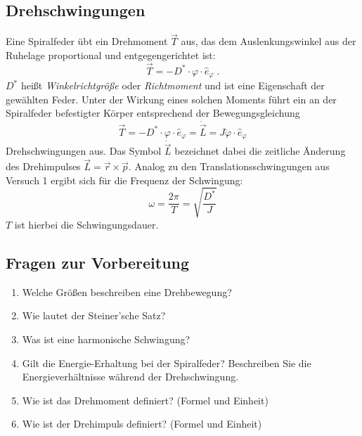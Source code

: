 \subsection{Drehschwingungen}

Eine Spiralfeder übt ein Drehmoment $\vec{T}$ aus, das dem Auslenkungswinkel aus der Ruhelage proportional und entgegengerichtet ist:
\begin{equation}
 \vec{T} = -D^*\cdot\varphi\cdot \hat{e}_{\varphi} \; .
\end{equation}
$D^*$ heißt \textit{Winkelrichtgröße} oder \textit{Richtmoment} und ist eine Eigenschaft der gewählten Feder. Unter der Wirkung eines solchen Moments führt ein an der Spiralfeder befestigter Körper entsprechend der Bewegungsgleichung
\begin{equation}
 \vec{T} = -D^*\cdot\varphi\cdot \hat{e}_{\varphi} = \dot{\vec{L}} = J\ddot{\varphi}\cdot\hat{e}_{\varphi}
\end{equation}
Drehschwingungen aus. Das Symbol $\dot{\vec{L}}$ bezeichnet dabei die zeitliche Änderung des Drehimpulses $\vec{L} = \vec{r}\times\vec{p}$. Analog zu den Translationsschwingungen aus Versuch 1 ergibt sich für die Frequenz der Schwingung:
\begin{equation}
 \omega = \frac{2\pi}{T} = \sqrt{\frac{D^*}{J}}
\end{equation}
$T$ ist hierbei die Schwingungsdauer.

\begin{tutorhint}
\section{Fragen zur Vorbereitung}

\begin{enumerate} 
 \item Welche Größen beschreiben eine Drehbewegung?
 \item Wie lautet der Steiner'sche Satz?
 \item Was ist eine harmonische Schwingung?
 \item Gilt die Energie-Erhaltung bei der Spiralfeder? Beschreiben Sie die Energieverhältnisse während der Drehschwingung.
 \item Wie ist das Drehmoment definiert? (Formel und Einheit)
 \item Wie ist der Drehimpuls definiert? (Formel und Einheit)
\end{enumerate} 
\end{tutorhint}

